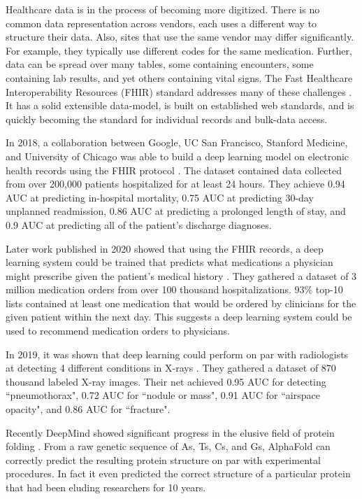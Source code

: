 Healthcare data is in the process of becoming more digitized.  There is no common data representation across vendors, each uses a different way to structure their data.  Also, sites that use the same vendor may differ significantly.  For example, they typically use different codes for the same medication. Further, data can be spread over many tables, some containing encounters, some containing lab results, and yet others containing vital signs. The Fast Healthcare Interoperability Resources (FHIR) standard addresses many of these challenges \cite{mandel2016smart}. It has a solid extensible data-model, is built on established web standards, and is quickly becoming the standard for individual records and bulk-data access.  

In 2018, a collaboration between Google, UC San Francisco, Stanford Medicine, and University of Chicago was able to build a deep learning model on electronic health records using the FHIR protocol \cite{rajkomar2018scalable}.  The dataset contained data collected from over 200,000 patients hospitalized for at least 24 hours.  They achieve 0.94 AUC at predicting in-hospital mortality, 0.75 AUC at predicting 30-day unplanned readmission, 0.86 AUC at predicting a prolonged length of stay, and 0.9 AUC at predicting all of the patient's discharge diagnoses.

Later work published in 2020 showed that using the FHIR records, a deep learning system could be trained that predicts what medications a physician might prescribe given the patient's medical history \cite{rough2020predicting}.  They gathered a dataset of 3 million medication orders from over 100 thousand hospitalizations.  93\% top-10 lists contained at least one medication that would be ordered by clinicians for the given patient within the next day.  This suggests a deep learning system could be used to recommend medication orders to physicians.

In 2019, it was shown that deep learning could perform on par with radiologists at detecting 4 different conditions in X-rays \cite{majkowska2020chest}.  They gathered a dataset of 870 thousand labeled X-ray images.  Their net achieved 0.95 AUC for detecting ``pneumothorax", 0.72 AUC for ``nodule or mass", 0.91 AUC for ``airspace opacity", and 0.86 AUC for ``fracture".

Recently DeepMind showed significant progress in the elusive field of protein folding \cite{senior2020improved}.  From a raw genetic sequence of As, Ts, Cs, and Gs, AlphaFold can correctly predict the resulting protein structure on par with experimental procedures.  In fact it even predicted the correct structure of a particular protein that had been eluding researchers for 10 years.

